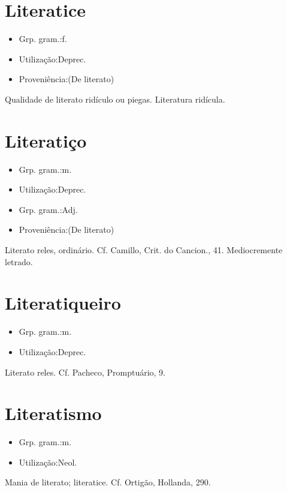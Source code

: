 \section{Literatice}
\begin{itemize}
\item {Grp. gram.:f.}
\end{itemize}
\begin{itemize}
\item {Utilização:Deprec.}
\end{itemize}
\begin{itemize}
\item {Proveniência:(De \textunderscore literato\textunderscore )}
\end{itemize}
Qualidade de literato ridículo ou piegas.
Literatura ridícula.
\section{Literatiço}
\begin{itemize}
\item {Grp. gram.:m.}
\end{itemize}
\begin{itemize}
\item {Utilização:Deprec.}
\end{itemize}
\begin{itemize}
\item {Grp. gram.:Adj.}
\end{itemize}
\begin{itemize}
\item {Proveniência:(De \textunderscore literato\textunderscore )}
\end{itemize}
Literato reles, ordinário. Cf. Camillo, \textunderscore Crit. do Cancion.\textunderscore , 41.
Mediocremente letrado.
\section{Literatiqueiro}
\begin{itemize}
\item {Grp. gram.:m.}
\end{itemize}
\begin{itemize}
\item {Utilização:Deprec.}
\end{itemize}
Literato reles. Cf. Pacheco, \textunderscore Promptuário\textunderscore , 9.
\section{Literatismo}
\begin{itemize}
\item {Grp. gram.:m.}
\end{itemize}
\begin{itemize}
\item {Utilização:Neol.}
\end{itemize}
Mania de literato; literatice. Cf. Ortigão, \textunderscore Hollanda\textunderscore , 290.

